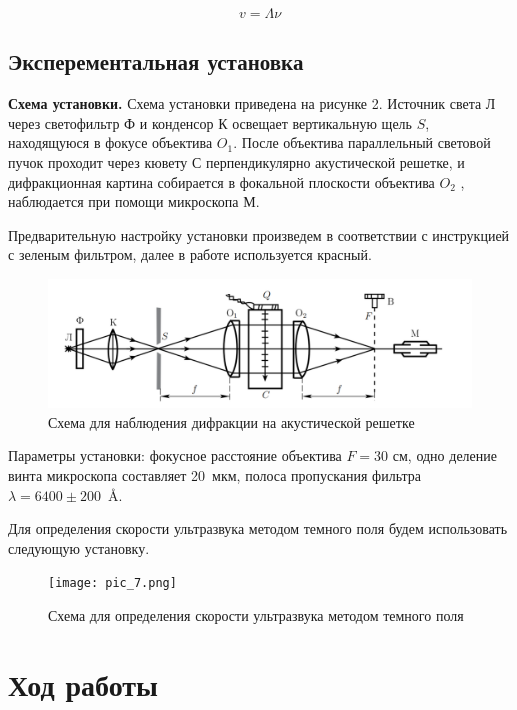 	\begin{equation}\label{}
	v = \Lambda \nu 
	\end{equation}
	
	\subsection*{Эксперементальная установка}
	
	\textbf{Схема установки. }Схема установки приведена на рисунке 2. Источник света Л через светофильтр Ф и конденсор К освещает вертикальную щель $ S $, находящуюся в фокусе объектива $ O_1 $. После объектива параллельный световой пучок проходит через кювету С перпендикулярно акустической решетке, и дифракционная картина собирается в фокальной плоскости объектива $ O_2 $ , наблюдается при помощи микроскопа М.
	
	Предварительную настройку установки произведем в соответствии с инструкцией с зеленым фильтром, далее в работе используется красный.
	
	\begin{figure}[H]
		\centering	
		\includegraphics[scale=0.3]{images/pic_2.png}
		\caption{Схема для наблюдения дифракции на акустической решетке}
		\label{shema1}
	\end{figure}
	
	Параметры установки: фокусное расстояние объектива $F = 30 $ см, одно деление винта микроскопа составляет 20~мкм, полоса пропускания фильтра \mbox{$\lambda = 6400\pm 200$ Å}.
	
	Для определения скорости ультразвука методом темного поля будем использовать следующую установку.
	\begin{figure}[H]
		\centering	
		\texttt{[image: pic\_7.png]}
		\caption{Схема для определения скорости ультразвука методом темного поля}
		\label{shema1}
	\end{figure}

	\section*{Ход работы}
